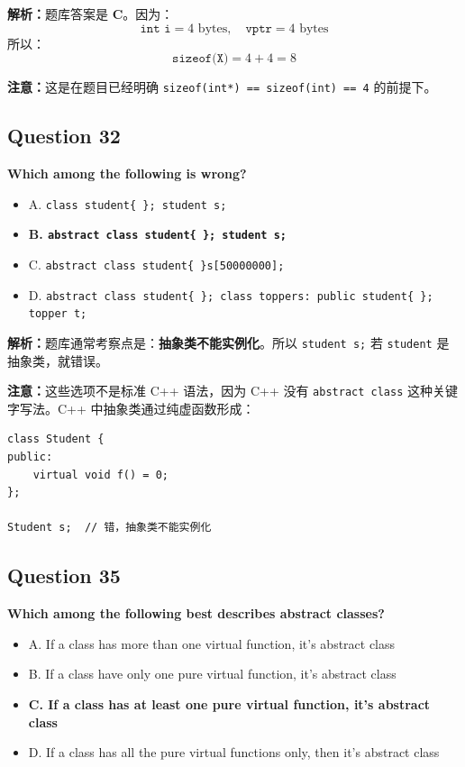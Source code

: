 \documentclass[11pt, a4paper]{article}
\begin{document}
\textbf{解析：}题库答案是 \textbf{C}。因为：
\[
\texttt{int i} = 4\text{ bytes}, \quad \texttt{vptr} = 4\text{ bytes}
\]
所以：
\[
\texttt{sizeof(X)} = 4 + 4 = 8
\]

\textbf{注意：}这是在题目已经明确 \texttt{sizeof(int*) == sizeof(int) == 4} 的前提下。


\subsection*{Question 32}
\textbf{Which among the following is wrong?}
\begin{itemize}
    \item A. \texttt{class student\{ \}; student s;}
    \item \textbf{B. \texttt{abstract class student\{ \}; student s;}}
    \item C. \texttt{abstract class student\{ \}s[50000000];}
    \item D. \texttt{abstract class student\{ \}; class toppers: public student\{ \}; topper t;}
\end{itemize}

\textbf{解析：}题库通常考察点是：\textbf{抽象类不能实例化}。所以 \texttt{student s;} 若 \texttt{student} 是抽象类，就错误。

\textbf{注意：}这些选项不是标准 C++ 语法，因为 C++ 没有 \texttt{abstract class} 这种关键字写法。C++ 中抽象类通过纯虚函数形成：
\begin{lstlisting}
class Student {
public:
    virtual void f() = 0;
};

Student s;  // 错，抽象类不能实例化
\end{lstlisting}


\subsection*{Question 35}
\textbf{Which among the following best describes abstract classes?}
\begin{itemize}
    \item A. If a class has more than one virtual function, it’s abstract class
    \item B. If a class have only one pure virtual function, it’s abstract class
    \item \textbf{C. If a class has at least one pure virtual function, it’s abstract class}
    \item D. If a class has all the pure virtual functions only, then it’s abstract class
\end{itemize}
\end{document}
